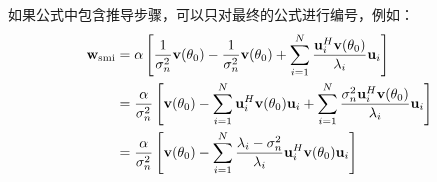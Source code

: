 如果公式中包含推导步骤，可以只对最终的公式进行编号，例如：
\begin{align}
	\mathbf{w}_{\mathrm{smi}} &= \alpha \left[\frac{1}{\sigma_n^2}\mathbf{v}(\theta_0) - \frac{1}{\sigma_n^2}\mathbf{v}(\theta_0) + \sum_{i=1}^{N} \frac{\mathbf{u}_i^H\mathbf{v}(\theta_0)}{\lambda_i} \mathbf{u}_i\right] \nonumber \\
	&= \frac{\alpha}{\sigma_n^2} \left[\mathbf{v}(\theta_0) - \sum_{i=1}^{N}\mathbf{u}_i^H\mathbf{v}(\theta_0)\mathbf{u}_i +  \sum_{i=1}^{N}\frac{\sigma_n^2\mathbf{u}_i^H\mathbf{v}(\theta_0)}{\lambda_i} \mathbf{u}_i \right] \nonumber \\
	&= \frac{\alpha}{\sigma_n^2} \left[\mathbf{v}(\theta_0) - \sum_{i=1}^{N} \frac{\lambda_i-\sigma_n^2}{\lambda_i} \mathbf{u}_i^H\mathbf{v}(\theta_0)\mathbf{u}_i \right]
\end{align}
